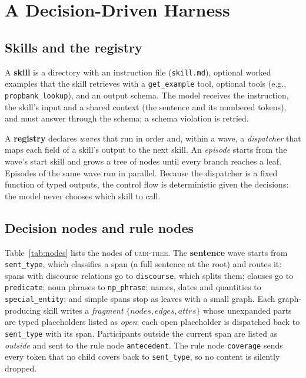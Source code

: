 \documentclass[11pt]{article}
\newcommand{\sys}{\textsc{umr-tree}\xspace}
\newcommand{\skill}[1]{\texttt{#1}}
\begin{document}
\section{A Decision-Driven Harness}
\label{sec:method}

\subsection{Skills and the registry}

A \textbf{skill} is a directory with an instruction file (\texttt{skill.md}), optional worked examples that the skill retrieves with a \texttt{get\_example} tool, optional tools (e.g., \texttt{propbank\_lookup}), and an output schema. The model receives the instruction, the skill's input and a shared context (the sentence and its numbered tokens), and must answer through the schema; a schema violation is retried.

A \textbf{registry} declares \emph{waves} that run in order and, within a wave, a \emph{dispatcher} that maps each field of a skill's output to the next skill. An \emph{episode} starts from the wave's start skill and grows a tree of nodes until every branch reaches a leaf. Episodes of the same wave run in parallel. Because the dispatcher is a fixed function of typed outputs, the control flow is deterministic given the decisions: the model never chooses which skill to call.

\subsection{Decision nodes and rule nodes}

Table~\ref{tab:nodes} lists the nodes of \sys. The \textbf{sentence} wave starts from \skill{sent\_type}, which classifies a span (a full sentence at the root) and routes it: spans with discourse relations go to \skill{discourse}, which splits them; clauses go to \skill{predicate}; noun phrases to \skill{np\_phrase}; names, dates and quantities to \skill{special\_entity}; and simple spans stop as leaves with a small graph. Each graph-producing skill writes a \emph{fragment} \(\{\textit{nodes},\textit{edges},\textit{attrs}\}\) whose unexpanded parts are typed placeholders listed as \emph{open}; each open placeholder is dispatched back to \skill{sent\_type} with its span. Participants outside the current span are listed as \emph{outside} and sent to the rule node \skill{antecedent}. The rule node \skill{coverage} sends every token that no child covers back to \skill{sent\_type}, so no content is silently dropped.
\end{document}
